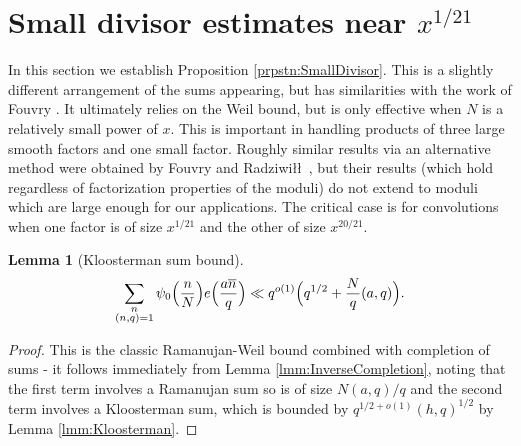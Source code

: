 \documentclass[10pt]{amsart}
\theoremstyle{plain}
\newtheorem{lmm}[thrm]{Lemma}
\numberwithin{equation}{section}
\begin{document}
\section{Small divisor estimates near \texorpdfstring{$x^{1/21}$}{x\^{}(1/21)}}\label{sec:SmallDivisor}
%
%
%
%
In this section we establish Proposition \ref{prpstn:SmallDivisor}. This is a slightly different arrangement of the sums appearing, but has similarities with the work of Fouvry \cite{Fouvry}. It ultimately relies on the Weil bound, but is only effective when $N$ is a relatively small power of $x$. This is important in handling products of three large smooth factors and one small factor. Roughly similar results via an alternative method were obtained by Fouvry and Radziwi\l\l\, \cite{FouvryRadziwill}, but their results (which hold regardless of factorization properties of the moduli) do not extend to moduli which are large enough for our applications. The critical case is for convolutions when one factor is of size $x^{1/21}$ and the other of size $x^{20/21}$.
%
%
%
%
%
%
%
%
\begin{lmm}[Kloosterman sum bound]\label{lmm:Weil}
\[
\sum_{\substack{n\\ (n,q)=1}}\psi_0\Bigl(\frac{n}{N}\Bigr)e\Bigl(\frac{a\overline{n}}{q}\Bigr)\ll q^{o(1)}\Bigl(q^{1/2}+\frac{N}{q}(a,q)\Bigr).
\]
\end{lmm}
%
%
%
%
\begin{proof}
This is the classic Ramanujan-Weil bound combined with completion of sums - it follows immediately from  Lemma \ref{lmm:InverseCompletion}, noting that the first term involves a Ramanujan sum so is of size $N(a,q)/q$ and the second term involves a Kloosterman sum, which is bounded by $q^{1/2+o(1)}(h,q)^{1/2}$ by Lemma \ref{lmm:Kloosterman}.
\end{proof}
%
%
%
%
%
%
%
%
\end{document}
